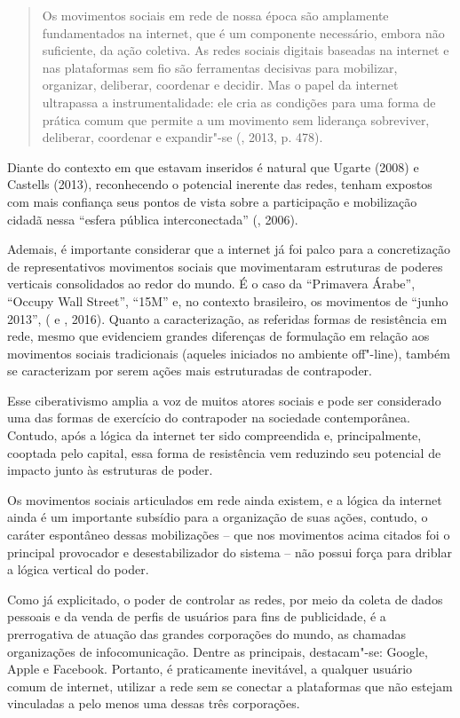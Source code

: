 \begin{quote}
Os movimentos sociais em rede de nossa época são amplamente
fundamentados na internet, que é um componente necessário, embora não
suficiente, da ação coletiva. As redes sociais digitais baseadas na
internet e nas plataformas sem fio são ferramentas decisivas para
mobilizar, organizar, deliberar, coordenar e decidir. Mas o papel da
internet ultrapassa a instrumentalidade: ele cria as condições para uma
forma de prática comum que permite a um movimento sem liderança
sobreviver, deliberar, coordenar e expandir"-se (, 2013, p. 478).
\end{quote}

Diante do contexto em que estavam inseridos é natural que Ugarte (2008)
e Castells (2013), reconhecendo o potencial inerente das redes, tenham
expostos com mais confiança seus pontos de vista sobre a participação e
mobilização cidadã nessa ``esfera pública interconectada'' (,
2006).

Ademais, é importante considerar que a internet já foi palco para a
concretização de representativos movimentos sociais que movimentaram
estruturas de poderes verticais consolidados ao redor do mundo. É o caso
da ``Primavera Árabe'', ``Occupy Wall Street'', ``15M'' e, no contexto
brasileiro, os movimentos de ``junho 2013'', ( e , 2016).
Quanto a caracterização, as referidas formas de resistência em rede,
mesmo que evidenciem grandes diferenças de formulação em relação aos
movimentos sociais tradicionais (aqueles iniciados no ambiente
off"-line), também se caracterizam por serem ações mais estruturadas de
contrapoder.

Esse ciberativismo amplia a voz de muitos atores sociais e pode ser
considerado uma das formas de exercício do contrapoder na sociedade
contemporânea. Contudo, após a lógica da internet ter sido compreendida
e, principalmente, cooptada pelo capital, essa forma de resistência vem
reduzindo seu potencial de impacto junto às estruturas de poder.

Os movimentos sociais articulados em rede ainda existem, e a lógica da
internet ainda é um importante subsídio para a organização de suas
ações, contudo, o caráter espontâneo dessas mobilizações -- que nos
movimentos acima citados foi o principal provocador e desestabilizador
do sistema -- não possui força para driblar a lógica vertical do poder.

Como já explicitado, o poder de controlar as redes, por meio da coleta
de dados pessoais e da venda de perfis de usuários para fins de
publicidade, é a prerrogativa de atuação das grandes corporações do
mundo, as chamadas organizações de infocomunicação. Dentre as
principais, destacam"-se: Google, Apple e Facebook. Portanto, é
praticamente inevitável, a qualquer usuário comum de internet, utilizar
a rede sem se conectar a plataformas que não estejam vinculadas a pelo
menos uma dessas três corporações.


